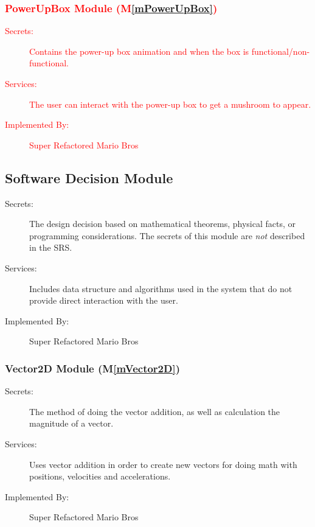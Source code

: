 \documentclass[12pt, titlepage]{article}
\newcommand{\mref}[1]{M\ref{#1}}
\begin{document}
\subsubsection{\textcolor{red}{PowerUpBox Module (\mref{mPowerUpBox})}}

\begin{description}
\item[\textcolor{red}{Secrets:}] \textcolor{red}{Contains the power-up box animation and when the box is functional/non-functional.}
\item[\textcolor{red}{Services:}] \textcolor{red}{The user can interact with the power-up box to get a mushroom to appear.}
\item[\textcolor{red}{Implemented By:}] \textcolor{red}{Super Refactored Mario Bros}
\end{description}

\subsection{Software Decision Module}

\begin{description}
\item[Secrets:] The design decision based on mathematical theorems, physical
  facts, or programming considerations. The secrets of this module are
  \emph{not} described in the SRS.
\item[Services:] Includes data structure and algorithms used in the system that
  do not provide direct interaction with the user.
\item[Implemented By:] Super Refactored Mario Bros
\end{description}

\subsubsection{Vector2D Module (\mref{mVector2D})}

\begin{description}
\item[Secrets:] The method of doing the vector addition, as well as calculation the magnitude of a vector.
\item[Services:] Uses vector addition in order to create new vectors for doing math with positions, velocities and accelerations.
\item[Implemented By:] Super Refactored Mario Bros
\end{description}
\end{document}
